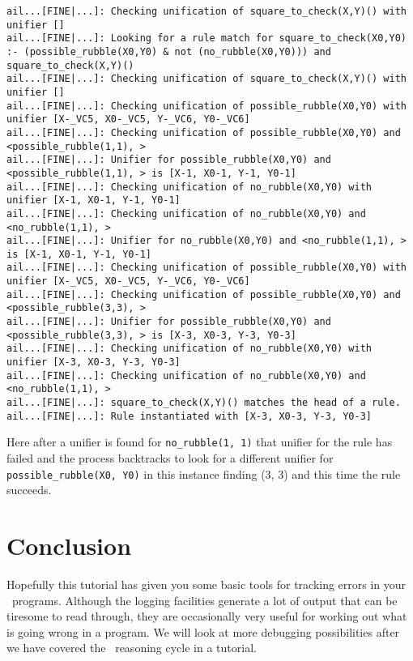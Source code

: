 \documentclass[a4]{article}
\begin{document}
\begin{verbatim}
ail...[FINE|...]: Checking unification of square_to_check(X,Y)() with unifier [] 
ail...[FINE|...]: Looking for a rule match for square_to_check(X0,Y0) :- (possible_rubble(X0,Y0) & not (no_rubble(X0,Y0))) and square_to_check(X,Y)() 
ail...[FINE|...]: Checking unification of square_to_check(X,Y)() with unifier [] 
ail...[FINE|...]: Checking unification of possible_rubble(X0,Y0) with unifier [X-_VC5, X0-_VC5, Y-_VC6, Y0-_VC6] 
ail...[FINE|...]: Checking unification of possible_rubble(X0,Y0) and <possible_rubble(1,1), > 
ail...[FINE|...]: Unifier for possible_rubble(X0,Y0) and <possible_rubble(1,1), > is [X-1, X0-1, Y-1, Y0-1] 
ail...[FINE|...]: Checking unification of no_rubble(X0,Y0) with unifier [X-1, X0-1, Y-1, Y0-1] 
ail...[FINE|...]: Checking unification of no_rubble(X0,Y0) and <no_rubble(1,1), > 
ail...[FINE|...]: Unifier for no_rubble(X0,Y0) and <no_rubble(1,1), > is [X-1, X0-1, Y-1, Y0-1] 
ail...[FINE|...]: Checking unification of possible_rubble(X0,Y0) with unifier [X-_VC5, X0-_VC5, Y-_VC6, Y0-_VC6] 
ail...[FINE|...]: Checking unification of possible_rubble(X0,Y0) and <possible_rubble(3,3), > 
ail...[FINE|...]: Unifier for possible_rubble(X0,Y0) and <possible_rubble(3,3), > is [X-3, X0-3, Y-3, Y0-3] 
ail...[FINE|...]: Checking unification of no_rubble(X0,Y0) with unifier [X-3, X0-3, Y-3, Y0-3] 
ail...[FINE|...]: Checking unification of no_rubble(X0,Y0) and <no_rubble(1,1), > 
ail...[FINE|...]: square_to_check(X,Y)() matches the head of a rule. 
ail...[FINE|...]: Rule instantiated with [X-3, X0-3, Y-3, Y0-3] 
\end{verbatim}
Here after a unifier is found for \texttt{no\_rubble(1, 1)} that unifier for the rule has failed and the process backtracks to look for a different unifier for \texttt{possible\_rubble(X0, Y0)} in this instance finding (3, 3) and this time the rule succeeds.

\section{Conclusion}
Hopefully this tutorial has given you some basic tools for tracking errors in your \gwendolen\ programs.  Although the logging facilities generate a lot of output that can be tiresome to read through, they are occasionally very useful for working out what is going wrong in a program.  We will look at more debugging possibilities after we have covered the \gwendolen\ reasoning cycle in a tutorial.
\end{document}
